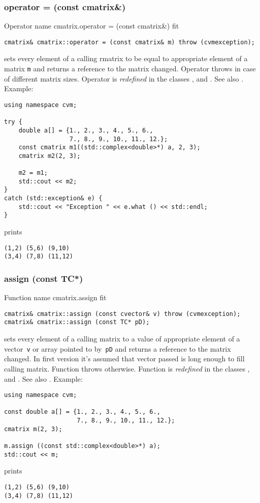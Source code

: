 \subsubsection{operator = (const cmatrix\&)}
Operator%
\pdfdest name {cmatrix.operator = (const cmatrix&)} fit
\begin{verbatim}
cmatrix& cmatrix::operator = (const cmatrix& m) throw (cvmexception);
\end{verbatim}
sets  every element of a calling rmatrix to be equal to
appropriate element of a matrix \verb"m"
and returns a reference to
the matrix changed.
Operator throws  
in case of different matrix sizes.
Operator is \emph{redefined} in the classes
,  
and .
See also .
Example:
\begin{Verbatim}
using namespace cvm;

try {
    double a[] = {1., 2., 3., 4., 5., 6.,
                  7., 8., 9., 10., 11., 12.};
    const cmatrix m1((std::complex<double>*) a, 2, 3);
    cmatrix m2(2, 3);

    m2 = m1;
    std::cout << m2;
}
catch (std::exception& e) {
    std::cout << "Exception " << e.what () << std::endl;
}
\end{Verbatim}
prints
\begin{Verbatim}
(1,2) (5,6) (9,10)
(3,4) (7,8) (11,12)
\end{Verbatim}
\newpage




\subsubsection{assign (const TC*)}
Function%
\pdfdest name {cmatrix.assign} fit
\begin{verbatim}
cmatrix& cmatrix::assign (const cvector& v) throw (cvmexception);
cmatrix& cmatrix::assign (const TC* pD);
\end{verbatim}
sets every element of a calling matrix to a value of
appropriate element of a vector~\verb'v'
or  array pointed to by~\verb"pD"
and returns a reference to
the matrix changed.
In first version it's assumed that vector passed is long
enough to fill calling matrix. Function throws  
otherwise.
Function is \emph{redefined} in the classes
,  
and .
See also .
Example:
\begin{Verbatim}
using namespace cvm;

const double a[] = {1., 2., 3., 4., 5., 6.,
                    7., 8., 9., 10., 11., 12.};
cmatrix m(2, 3);

m.assign ((const std::complex<double>*) a);
std::cout << m;
\end{Verbatim}
prints
\begin{Verbatim}
(1,2) (5,6) (9,10)
(3,4) (7,8) (11,12)
\end{Verbatim}
\newpage




